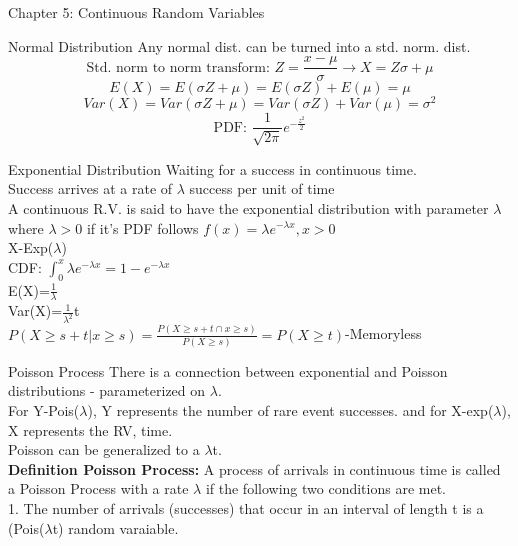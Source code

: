 \documentclass[a4paper, 12pt]{article}
\begin{document}
\begin{section}{Chapter 5: Continuous Random Variables}
\begin{subsection}{Normal Distribution}
Any normal dist. can be turned into a std. norm. dist.\\
\begin{equation} 
\mbox{Std. norm to norm transform: } Z=\frac{x-\mu}{\sigma} \to X=Z\sigma+\mu
\end{equation}
\begin{equation} 
E(X)=E(\sigma Z+\mu)=E(\sigma Z)+E(\mu)=\mu
\end{equation}
\begin{equation} 
Var(X)=Var(\sigma Z+\mu)=Var(\sigma Z)+Var(\mu)=\sigma^{2}
\end{equation}
\begin{equation} 
\mbox{PDF: }\frac{1}{\sqrt{2\pi}}e^{-\frac{z^{2}}{2}}
\end{equation}
\end{subsection}
\begin{subsection}{Exponential Distribution}
Waiting for a success in continuous time.\\
Success arrives at a rate of $\lambda$ success per unit of time\\
A continuous R.V. is said to have the exponential distribution with parameter $\lambda$ where $\lambda>0$ if it's PDF follows $f(x)=\lambda e^{-\lambda x}, x>0$\\
X-Exp($\lambda$)\\
CDF: $\int_{0}^{x}\lambda e^{-\lambda x}=1-e^{-\lambda x}$\\
E(X)=$\frac{1}{\lambda}$\\
Var(X)=$\frac{1}{\lambda^{2}}$t\\
$P(X\geq s+t|x\geq s)=\frac{P(X\geq s+t\cap x\geq s)}{P(X\geq s)}=P(X\geq t)$-Memoryless
\end{subsection}
\begin{subsection}{Poisson Process}
There is a connection between exponential and Poisson distributions - parameterized on $\lambda$.\\
For Y-Pois($\lambda$), Y represents the number of rare event successes. and for X-exp($\lambda$), X represents the RV, time. \\
Poisson can be generalized to a $\lambda$t.\\
\textbf{Definition Poisson Process:} A process of arrivals in continuous time is called
a Poisson Process with a rate $\lambda$ if the following two conditions are met.\\
1. The number of arrivals (successes) that occur in an interval of length t is a (Pois($\lambda$t) random varaiable.\\

\end{subsection}
\end{section}
\end{document}
